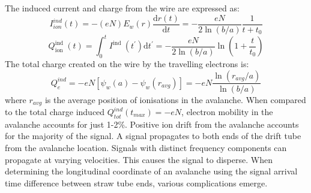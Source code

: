 The induced current and charge from the wire are expressed as:
 \begin{equation}
    I_{i o n}^{i n d}(t)=-(e N) E_w(r) \frac{\mathrm{d} r(t)}{\mathrm{d} t}=-\frac{e N}{2 \ln (b / a)} \frac{1}{t+t_0}
    \end{equation}
    \begin{equation}
        Q_{\text {ion }}^{\text {ind }}(t)=\int_0^t I^{\text {ind }}\left(t^{\prime}\right) \mathrm{d} t^{\prime}=-\frac{e N}{2 \ln (b / a)} \ln \left(1+\frac{t}{t_0}\right)
        \end{equation}
The total charge created on the wire by the travelling electrons is:
\begin{equation}
    Q_e^{i n d}=-e N\left[\psi_w(a)-\psi_w\left(r_{a v g}\right)\right]=-e N \frac{\ln \left(r_{a v g} / a\right)}{\ln (b / a)}
    \end{equation}
    where $r_{avg}$ is the average position of ionisations in the avalanche. When compared to the total charge 
    induced $Q^{ind}_{tot}(t_{max}) = -eN$, electron mobility in the avalanche accounts for just 1-2\%. 
    Positive ion drift from the avalanche accounts for the majority of the signal. A signal propagates 
    to both ends of the drift tube from the avalanche location.
    Signals with distinct frequency components can propagate at varying velocities. This causes the signal to disperse.
    When determining the longitudinal coordinate of an avalanche using the signal arrival time difference between straw tube ends, various complications emerge.
